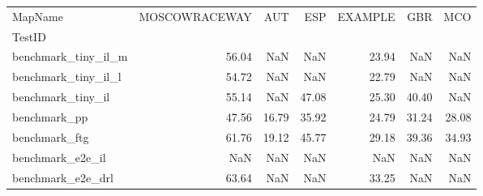 \begin{tabular}{lrrrrrr}
\toprule
MapName & MOSCOWRACEWAY & AUT & ESP & EXAMPLE & GBR & MCO \\
TestID &  &  &  &  &  &  \\
\midrule
benchmark_tiny_il_m & 56.04 & NaN & NaN & 23.94 & NaN & NaN \\
benchmark_tiny_il_l & 54.72 & NaN & NaN & 22.79 & NaN & NaN \\
benchmark_tiny_il & 55.14 & NaN & 47.08 & 25.30 & 40.40 & NaN \\
benchmark_pp & 47.56 & 16.79 & 35.92 & 24.79 & 31.24 & 28.08 \\
benchmark_ftg & 61.76 & 19.12 & 45.77 & 29.18 & 39.36 & 34.93 \\
benchmark_e2e_il & NaN & NaN & NaN & NaN & NaN & NaN \\
benchmark_e2e_drl & 63.64 & NaN & NaN & 33.25 & NaN & NaN \\
\bottomrule
\end{tabular}
